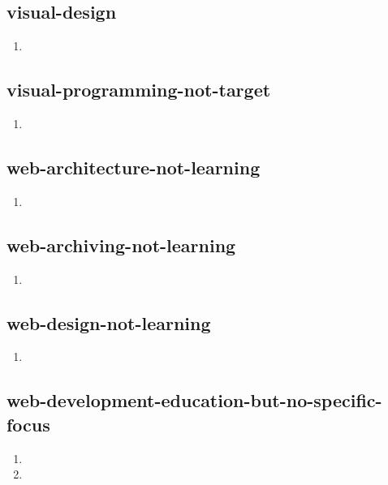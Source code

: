 \documentclass{article}
\begin{document}
\subsection{visual-design}
\begin{enumerate}
\item {}
\end{enumerate}

\subsection{visual-programming-not-target}
\begin{enumerate}
\item {}
\end{enumerate}

\subsection{web-architecture-not-learning}
\begin{enumerate}
\item {}
\end{enumerate}

\subsection{web-archiving-not-learning}
\begin{enumerate}
\item {}
\end{enumerate}

\subsection{web-design-not-learning}
\begin{enumerate}
\item {}
\end{enumerate}

\subsection{web-development-education-but-no-specific-focus}
\begin{enumerate}
\item {}
\item {}
\end{enumerate}
\end{document}
